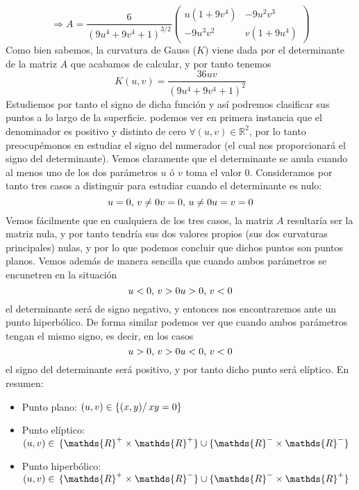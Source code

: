 \documentclass[fleqn]{article}
\def\R{\mathds{R}}
\begin{document}
    $$
    \Rightarrow A = \frac{6}{(9u^4 + 9v^4 + 1)^{3/2}}
    \begin{pmatrix}
        u(1+9v^4) & -9u^2v^3 \\
        -9u^3v^2 & v(1+9u^4)
    \end{pmatrix}
    $$
    Como bien sabemos, la curvatura de Gauss ($K$) viene dada por el determinante de la matriz $A$ que acabamos de calcular, y por tanto tenemos
    $$K(u,v) = \frac{36uv}{(9u^4 + 9v^4 + 1)^{2}}$$
    Estudiemos por tanto el signo de dicha función y así podremos clasificar sus puntos a lo largo de la superficie. podemos ver en primera instancia que el denominador
    es positivo y distinto de cero $\forall (u,v) \in \R^2$, por lo tanto preocupémonos en estudiar el signo del numerador (el cual nos proporcionará el signo del determinante). 
    Vemos claramente que el determinante se anula cuando al menos uno de los dos parámetros $u$ ó $v$ toma el valor $0$. Consideramos por tanto tres casos a 
    distinguir para estudiar cuando el determinante es nulo:
    \begin{equation*}
        u=0, \thinspace v\neq 0 \\
        v=0, \thinspace u\neq 0 \\
        u = v = 0
    \end{equation*}
    Vemos fácilmente que en cualquiera de los tres casos, la matriz $A$ resultaría ser la matriz nula, y por tanto tendría sus dos valores propios (sus dos curvaturas principales)
    nulas, y por lo que podemos concluir que dichos puntos son puntos planos. Vemos además de manera sencilla que cuando ambos parámetros se encunetren en la situación 
    \begin{equation*}
        u<0, \thinspace v>0 \\
        u>0, \thinspace v<0
    \end{equation*}
    el determinante será de signo negativo, y entonces nos encontraremos ante un punto hiperbólico. De forma similar podemos ver que cuando ambos parámetros tengan el mismo signo,
    es decir, en los casos
    \begin{equation*}
        u>0, \thinspace v>0 \\
        u<0, \thinspace v<0
    \end{equation*}
    el signo del determinante será positivo, y por tanto dicho punto será elíptico. En resumen:
    \begin{itemize}
        \item Punto plano: $(u,v) \in \{(x,y)/ \thinspace xy=0\}$ 
        \item Punto elíptico: $(u,v) \in \thinspace \{\R^+ \times \R^+\} \cup \{\R^- \times \R^-\}$
        \item Punto hiperbólico: $(u,v) \in \thinspace \{\R^+ \times \R^-\} \cup \{\R^- \times \R^+\}$
    \end{itemize}
\end{document}
